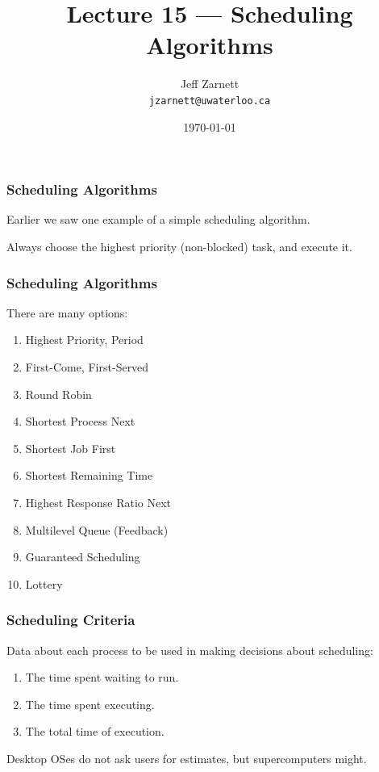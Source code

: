 

\title{Lecture 15 --- Scheduling Algorithms}

\author{Jeff Zarnett \\ \small \texttt{jzarnett@uwaterloo.ca}}
\date{\today}




\begin{frame}
  \titlepage

 \end{frame}



\begin{frame}
\frametitle{Scheduling Algorithms}

Earlier we saw one example of a simple scheduling algorithm. 

Always choose the highest priority (non-blocked) task, and execute it. 

 \end{frame}



\begin{frame}
\frametitle{Scheduling Algorithms}


There are many options:
\begin{enumerate}
	\item Highest Priority, Period
	\item First-Come, First-Served
	\item Round Robin
	\item Shortest Process Next
	\item Shortest Job First
	\item Shortest Remaining Time
	\item Highest Response Ratio Next
	\item Multilevel Queue (Feedback)
	\item Guaranteed Scheduling
	\item Lottery
\end{enumerate}


\end{frame}

\begin{frame}
\frametitle{Scheduling Criteria}

Data about each process to be used in making decisions about scheduling:

\begin{enumerate}
	\item The time spent waiting to run.
	\item The time spent executing.
	\item The total time of execution.
\end{enumerate}

Desktop OSes do not ask users for estimates, but supercomputers might.

\end{frame}

